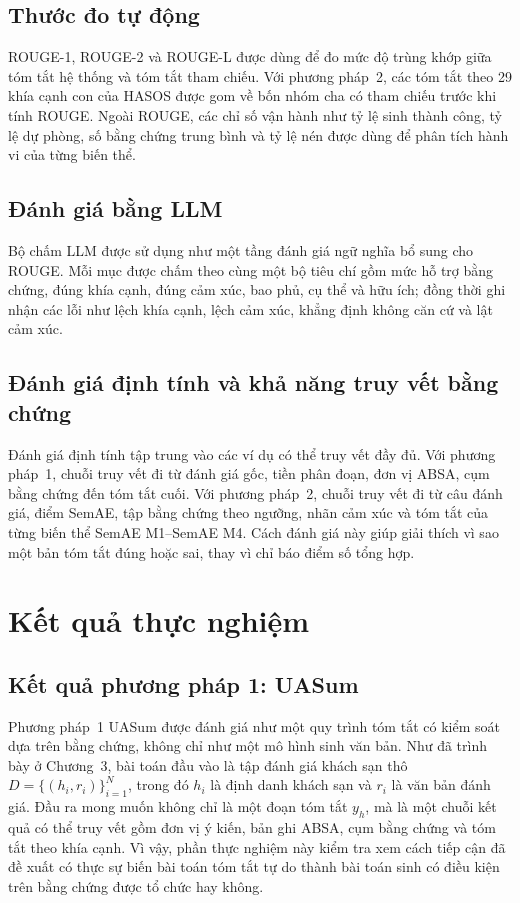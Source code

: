 \subsection{Thước đo tự động}
ROUGE-1, ROUGE-2 và ROUGE-L được dùng để đo mức độ trùng khớp giữa tóm tắt hệ thống và tóm tắt tham chiếu. Với phương pháp~2, các tóm tắt theo 29 khía cạnh con của HASOS được gom về bốn nhóm cha có tham chiếu trước khi tính ROUGE. Ngoài ROUGE, các chỉ số vận hành như tỷ lệ sinh thành công, tỷ lệ dự phòng, số bằng chứng trung bình và tỷ lệ nén được dùng để phân tích hành vi của từng biến thể.

\subsection{Đánh giá bằng LLM}
Bộ chấm LLM được sử dụng như một tầng đánh giá ngữ nghĩa bổ sung cho ROUGE. Mỗi mục được chấm theo cùng một bộ tiêu chí gồm mức hỗ trợ bằng chứng, đúng khía cạnh, đúng cảm xúc, bao phủ, cụ thể và hữu ích; đồng thời ghi nhận các lỗi như lệch khía cạnh, lệch cảm xúc, khẳng định không căn cứ và lật cảm xúc.

\subsection{Đánh giá định tính và khả năng truy vết bằng chứng}
Đánh giá định tính tập trung vào các ví dụ có thể truy vết đầy đủ. Với phương pháp~1, chuỗi truy vết đi từ đánh giá gốc, tiền phân đoạn, đơn vị ABSA, cụm bằng chứng đến tóm tắt cuối. Với phương pháp~2, chuỗi truy vết đi từ câu đánh giá, điểm SemAE, tập bằng chứng theo ngưỡng, nhãn cảm xúc và tóm tắt của từng biến thể SemAE M1--SemAE M4. Cách đánh giá này giúp giải thích vì sao một bản tóm tắt đúng hoặc sai, thay vì chỉ báo điểm số tổng hợp.

\section{Kết quả thực nghiệm}
\label{sec:experimental-results}

\subsection{Kết quả phương pháp 1: UASum}
\label{sec:phuong-phap-1-absa}

Phương pháp~1 UASum được đánh giá như một quy trình tóm tắt có kiểm soát dựa trên bằng chứng, không chỉ như một mô hình sinh văn bản. Như đã trình bày ở Chương~3, bài toán đầu vào là tập đánh giá khách sạn thô $D=\{(h_i,r_i)\}_{i=1}^{N}$, trong đó $h_i$ là định danh khách sạn và $r_i$ là văn bản đánh giá. Đầu ra mong muốn không chỉ là một đoạn tóm tắt $y_h$, mà là một chuỗi kết quả có thể truy vết gồm đơn vị ý kiến, bản ghi ABSA, cụm bằng chứng và tóm tắt theo khía cạnh. Vì vậy, phần thực nghiệm này kiểm tra xem cách tiếp cận đã đề xuất có thực sự biến bài toán tóm tắt tự do thành bài toán sinh có điều kiện trên bằng chứng được tổ chức hay không.

